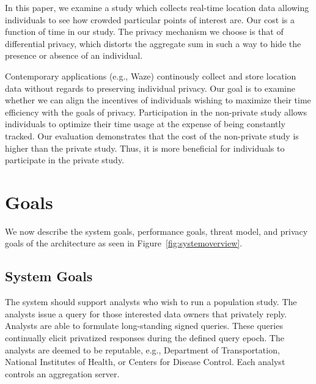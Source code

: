 \documentclass[conference]{IEEEtran}
\begin{document}
In this paper, we examine a study which collects real-time location data allowing individuals to see how crowded particular points of interest are. Our cost is a function of time in our study. The privacy mechanism we choose is that of differential privacy, which distorts the aggregate sum in such a way to hide the presence or absence of an individual.

Contemporary applications (e.g., Waze) continously collect and store location data without regards to preserving individual privacy. Our goal is to examine whether we can align the incentives of individuals wishing to  maximize their time efficiency with the goals of privacy. Participation in the non-private study allows individuals to optimize their time usage at the expense of being constantly tracked. Our evaluation demonstrates that the cost of the non-private study is higher than the private study. Thus, it is more beneficial for individuals to participate in the private study.






 \section{Goals}

We now describe the system goals, performance goals, threat model, and privacy goals of the architecture as seen in Figure~\ref{fig:systemoverview}.

\subsection{System Goals}

The system should support analysts who wish to run a population study. The analysts issue a query for those interested data owners that privately reply. Analysts are able to formulate long-standing signed queries. These queries continually elicit privatized responses during the defined query epoch. The analysts are deemed to be reputable, e.g., Department of Transportation, National Institutes of Health, or Centers for Disease Control. Each analyst controls an aggregation server.
\end{document}
